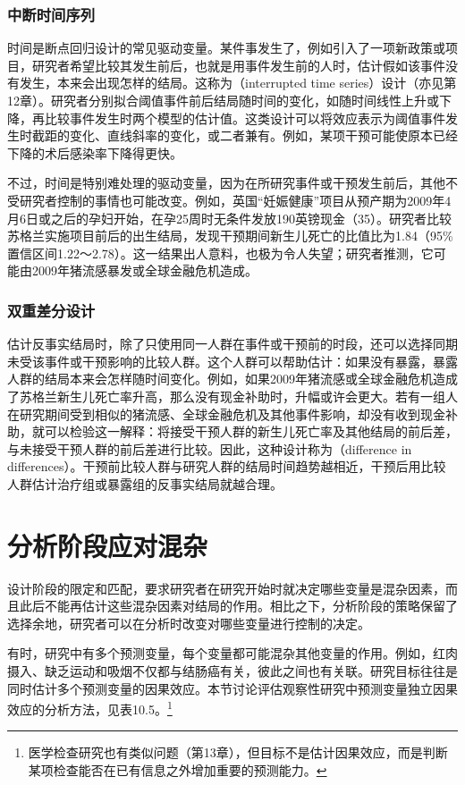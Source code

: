 \subsubsection{中断时间序列}
时间是断点回归设计的常见驱动变量。某件事发生了，例如引入了一项新政策或项目，研究者希望比较其发生前后，也就是用事件发生前的人时，估计假如该事件没有发生，本来会出现怎样的结局。这称为（interrupted time series）设计（亦见第12章）。研究者分别拟合阈值事件前后结局随时间的变化，如随时间线性上升或下降，再比较事件发生时两个模型的估计值。这类设计可以将效应表示为阈值事件发生时截距的变化、直线斜率的变化，或二者兼有。例如，某项干预可能使原本已经下降的术后感染率下降得更快。

不过，时间是特别难处理的驱动变量，因为在所研究事件或干预发生前后，其他不受研究者控制的事情也可能改变。例如，英国“妊娠健康”项目从预产期为2009年4月6日或之后的孕妇开始，在孕25周时无条件发放190英镑现金（35）。研究者比较苏格兰实施项目前后的出生结局，发现干预期间新生儿死亡的比值比为1.84（95\%置信区间1.22～2.78）。这一结果出人意料，也极为令人失望；研究者推测，它可能由2009年猪流感暴发或全球金融危机造成。

\subsubsection{双重差分设计}
估计反事实结局时，除了只使用同一人群在事件或干预前的时段，还可以选择同期未受该事件或干预影响的比较人群。这个人群可以帮助估计：如果没有暴露，暴露人群的结局本来会怎样随时间变化。例如，如果2009年猪流感或全球金融危机造成了苏格兰新生儿死亡率升高，那么没有现金补助时，升幅或许会更大。若有一组人在研究期间受到相似的猪流感、全球金融危机及其他事件影响，却没有收到现金补助，就可以检验这一解释：将接受干预人群的新生儿死亡率及其他结局的前后差，与未接受干预人群的前后差进行比较。因此，这种设计称为（difference in differences）。干预前比较人群与研究人群的结局时间趋势越相近，干预后用比较人群估计治疗组或暴露组的反事实结局就越合理。

\section{分析阶段应对混杂}
设计阶段的限定和匹配，要求研究者在研究开始时就决定哪些变量是混杂因素，而且此后不能再估计这些混杂因素对结局的作用。相比之下，分析阶段的策略保留了选择余地，研究者可以在分析时改变对哪些变量进行控制的决定。

有时，研究中有多个预测变量，每个变量都可能混杂其他变量的作用。例如，红肉摄入、缺乏运动和吸烟不仅都与结肠癌有关，彼此之间也有关联。研究目标往往是同时估计多个预测变量的因果效应。本节讨论评估观察性研究中预测变量独立因果效应的分析方法，见表10.5。\footnote{医学检查研究也有类似问题（第13章），但目标不是估计因果效应，而是判断某项检查能否在已有信息之外增加重要的预测能力。}

